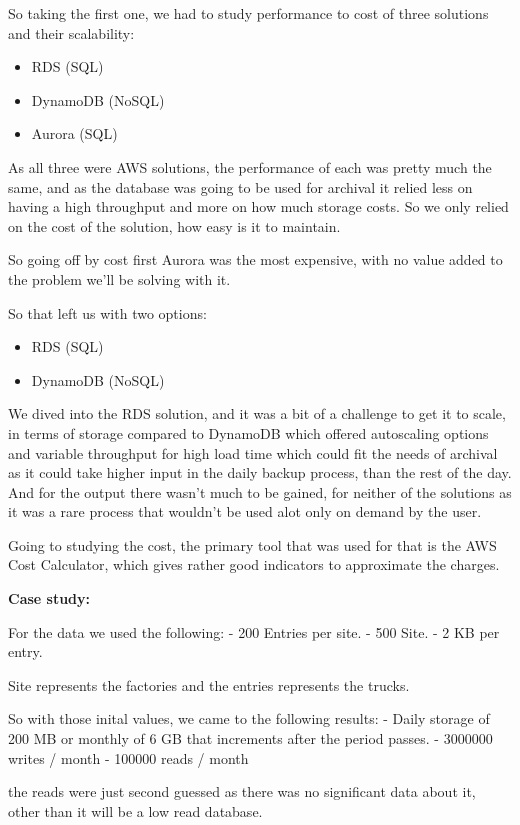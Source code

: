 So taking the first one, we had to study performance to cost of three solutions and their scalability:
    \begin{itemize}
        \item RDS (SQL)
        \item DynamoDB (NoSQL)
        \item Aurora (SQL)
    \end{itemize}

As all three were AWS solutions, the performance of each was pretty much the same,
and as the database was going to be used for archival it relied less on having a
high throughput and more on how much storage costs.
So we only relied on the cost of the solution, how easy is it to maintain.

So going off by cost first Aurora was the most expensive, with no value added to the problem we'll be solving with it.

So that left us with two options:
    \begin{itemize}
        \item RDS (SQL)
        \item DynamoDB (NoSQL)
    \end{itemize}

We dived into the RDS solution, and it was a bit of a challenge to get it to scale,
in terms of storage compared to DynamoDB which offered autoscaling options and variable
throughput for high load time which could fit the needs of archival as it could take 
higher input in the daily backup process, than the rest of the day.
And for the output there wasn't much to be gained, for neither of the solutions as it was
a rare process that wouldn't be used alot only on demand by the user.

Going to studying the cost, the primary tool that was used for that is the AWS Cost Calculator, which gives rather good indicators to approximate the charges.

\textbf{Case study: }

For the data we used the following:
- 200 Entries per site.
- 500 Site.
- 2 KB per entry.

Site represents the factories and the entries represents the trucks.

So with those inital values, we came to the following results:
- Daily storage of 200 MB or monthly of 6 GB that increments after the period passes.
- 3000000 writes / month
- 100000 reads / month

the reads were just second guessed as there was no significant data about it, 
other than it will be a low read database.

